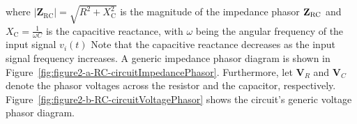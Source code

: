 %
where $|\mathbf{Z}_{\text{RC}}| = \sqrt{R^2 + X_{\text{C}}^2}$ is the magnitude of the impedance phasor ${\bf Z}_{\text{RC}}$ and $X_{\text{C}}=\frac{1}{\omega C}$  is the capacitive reactance, with $\omega$ being the angular frequency of the input signal $v_i(t)$  Note that the capacitive reactance decreases as the input signal frequency increases. A generic impedance phasor diagram is shown in Figure~\ref{fig:figure2-a-RC-circuitImpedancePhasor}. Furthermore, let $\mathbf{V}_R$ and $\mathbf{V}_C$ denote the phasor voltages across the resistor and the capacitor, respectively. Figure~\ref{fig:figure2-b-RC-circuitVoltagePhasor} shows the circuit's generic voltage phasor diagram.  
%
%
